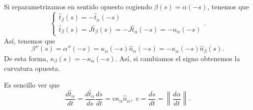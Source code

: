 \begin{observation}
Si reparametrizamos en sentido opuesto cogiendo $\displaystyle \beta\left(s\right)=\alpha\left(-s\right) $, tenemos que 
\[
\begin{cases}
\hat{t}_{\beta }\left(s\right) = -\hat{t}_{\alpha }\left(-s\right) \\
\hat{t}_{\beta }\left(s\right)=J\hat{t}_{\beta }\left(s\right)=-J\hat{t}_{\alpha }\left(-s\right)=-\hat{n}_{\alpha }\left(-s\right)
\end{cases}
.\]
Así, tenemos que 
\[\beta''\left(s\right)=\alpha''\left(-s\right)=\kappa_{\alpha }\left(-s\right)\hat{n}_{\alpha }\left(-s\right)=-\kappa_{\alpha }\left(-s\right)\hat{n}_{\beta }\left(s\right) .\]
De esta forma, $\displaystyle \kappa_{\beta }\left(s\right)=-\kappa_{\alpha }\left(-s\right) $. Así, si cambiamos el signo obtenemos la curvatura opuesta.
\end{observation}

\begin{observation}
Es sencillo ver que 
\[\frac{d\hat{t}_{\alpha }}{dt} = \frac{d\hat{t}_{\alpha }}{d s}\frac{d s}{dt}=v\kappa_{\alpha }\hat{n}_{\alpha }, \; v = \frac{d s}{dt}= \left\|\frac{d\alpha }{dt}\right\| .\]
\end{observation}


